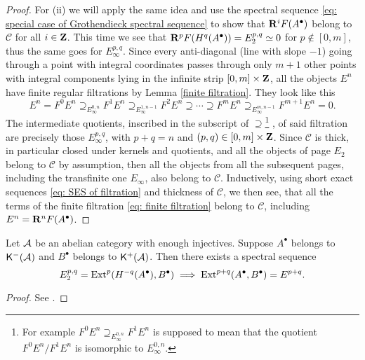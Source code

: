 \begin{proof}
    For (ii) we will apply the same idea and use the spectral sequence \eqref{eq: special case of Grothendieck spectral sequence} to show that $\mathbf{R}^{i}F(A^\bullet)$ belong to $\mathcal C$ for all $i \in \mathbf Z$. This time we see that $\mathbf{R}^{p}F(H^q(A^\bullet)) = E^{p,q}_2 \simeq 0$ for $p \notin [0,m]$, thus the same goes for $E^{p,q}_\infty$. Since every anti-diagonal (line with slope $-1$) going through a point with integral coordinates passes through only $m+1$ other points with integral components lying in the infinite strip $[0,m] \times \mathbf Z$, all the objects $E^n$ have finite regular filtrations by Lemma \ref{finite filtration}. They look like this
    \begin{equation}
        \label{eq: finite filtration}
        E^n = F^0E^n \supseteq_{E^{0,n}_\infty} F^1E^n \supseteq_{E^{1, n-1}_\infty} F^2E^n \supseteq \cdots \supseteq F^mE^n \supseteq_{E^{m, n-1}_\infty} F^{m+1}E^n = 0.
    \end{equation}
    The intermediate quotients, inscribed in the subscript of $\supseteq$\footnote{
        For example $F^0E^n \supseteq_{E^{0,n}_\infty} F^1E^n$ is supposed to mean that the quotient $F^0E^n / F^1E^n$ is isomorphic to $E^{0,n}_\infty$.}
    , of said filtration are precisely those $E^{p,q}_\infty$, with $p+q = n$ and $(p,q) \in [0,m] \times \mathbf Z$. Since $\mathcal C$ is thick, in particular closed under kernels and quotients, and all the objects of page $E_2$ belong to $\mathcal C$ by assumption, then all the objects from all the subsequent pages, including the transfinite one $E_\infty$, also belong to $\mathcal C$. 
    Inductively, using short exact sequences \eqref{eq: SES of filtration} and thickness of $\mathcal C$, we then see, that all the terms of the finite filtration \eqref{eq: finite filtration} belong to $\mathcal C$, including $E^n = \mathbf{R}^{n}F(A^\bullet)$.
\end{proof}

\begin{proposition}
    Let $\mathcal A$ be an abelian category with enough injectives. Suppose $A^\bullet$ belongs to $\mathsf{K}^-(\mathcal A)$ and $B^\bullet$ belongs to $\mathsf{K}^+(\mathcal A)$. Then there exists a spectral sequence 
    \[
        E^{p,q}_2 = \operatorname{Ext}^p(H^{-q}(A^\bullet), B^\bullet) \implies \operatorname{Ext}^{p+q}(A^\bullet, B^\bullet) = E^{p+q}.
    \]
\end{proposition}

\begin{proof}
    See \cite[\S 2, Example 2.70]{huybrechts2006fouriermukai}.
\end{proof}